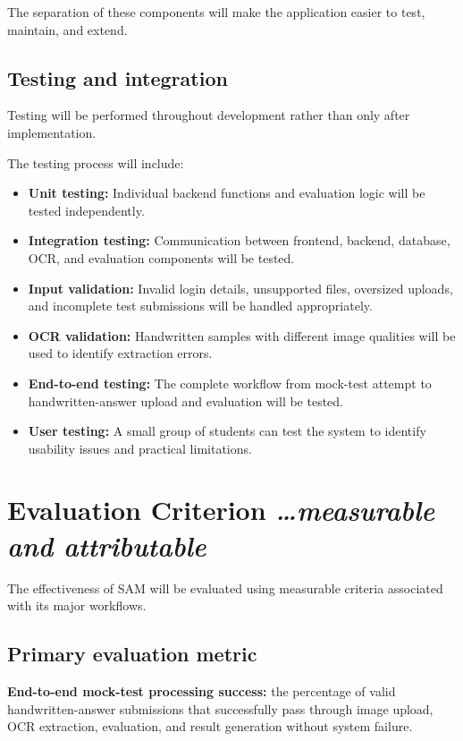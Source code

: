 \documentclass[11pt,a4paper]{article}
\newcommand{\BvrHint}[1]{%
  {\normalfont\normalsize\itshape\hfill #1}}
\begin{document}
The separation of these components will make the application easier to test, maintain, and extend.

\subsection{Testing and integration}
Testing will be performed throughout development rather than only after implementation.

The testing process will include:

\begin{itemize}
    \item \textbf{Unit testing:} Individual backend functions and evaluation logic will be tested independently.

    \item \textbf{Integration testing:} Communication between frontend, backend, database, OCR, and evaluation components will be tested.

    \item \textbf{Input validation:} Invalid login details, unsupported files, oversized uploads, and incomplete test submissions will be handled appropriately.

    \item \textbf{OCR validation:} Handwritten samples with different image qualities will be used to identify extraction errors.

    \item \textbf{End-to-end testing:} The complete workflow from mock-test attempt to handwritten-answer upload and evaluation will be tested.

    \item \textbf{User testing:} A small group of students can test the system to identify usability issues and practical limitations.
\end{itemize}

\section{Evaluation Criterion %
\BvrHint{\ldots measurable and attributable}}
The effectiveness of SAM will be evaluated using measurable criteria associated with its major workflows.

\subsection{Primary evaluation metric}
\textbf{End-to-end mock-test processing success:} the percentage of valid handwritten-answer submissions that successfully pass through image upload, OCR extraction, evaluation, and result generation without system failure.
\end{document}
